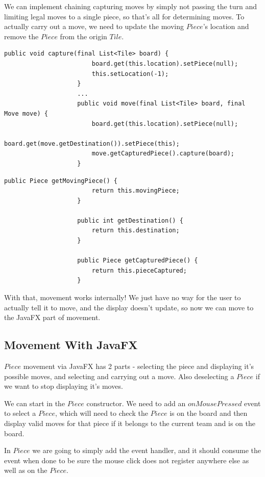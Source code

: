 \documentclass[a4paper]{report}
\begin{document}
				We can implement chaining capturing moves by simply not passing the turn and limiting legal moves to a single piece, so that's all for determining moves. To actually carry out a move, we need to update the moving $Piece$'s location and remove the $Piece$ from the origin $Tile$.
				
				\pagebreak
				
				\begin{lstlisting}[gobble=20, frame=top, caption=Piece.java]
					public void capture(final List<Tile> board) {
						board.get(this.location).setPiece(null);
						this.setLocation(-1);
					}
					...
					public void move(final List<Tile> board, final Move move) {
						board.get(this.location).setPiece(null);
						board.get(move.getDestination()).setPiece(this);
						move.getCapturedPiece().capture(board);
					}
				\end{lstlisting}
				\begin{lstlisting}[gobble=20, frame=top, caption=Move.java]
					public Piece getMovingPiece() {
						return this.movingPiece;
					}
					
					public int getDestination() {
						return this.destination;
					}
					
					public Piece getCapturedPiece() {
						return this.pieceCaptured;
					}
				\end{lstlisting}
				
				With that, movement works internally! We just have no way for the user to actually tell it to move, and the display doesn't update, so now we can move to the JavaFX part of movement.
				
			\subsection{Movement With JavaFX}\label{subsec:in depth example - movement with javafx}
			
				$Piece$ movement via JavaFX has 2 parts - selecting the piece and displaying it's possible moves, and selecting and carrying out a move. Also deselecting a $Piece$ if we want to stop displaying it's moves.
				
				We can start in the $Piece$ constructor. We need to add an $onMousePressed$ event to select a $Piece$, which will need to check the $Piece$ is on the board and then display valid moves for that piece if it belongs to the current team and is on the board.
				
				In $Piece$ we are going to simply add the event handler, and it should consume the event when done to be sure the mouse click does not register anywhere else as well as on the $Piece$.
				
\end{document}
